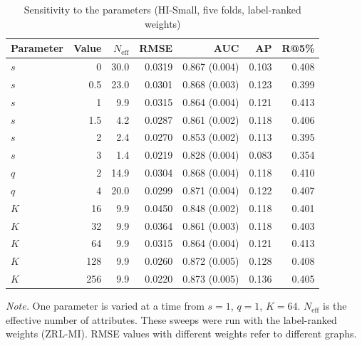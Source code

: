\begin{table}[t]
\caption{Sensitivity to the parameters (HI-Small, five folds, label-ranked weights)}
\label{tab:sens}
\centering
\footnotesize
\begin{tabular}{@{}lrrrrrr@{}}
\toprule
Parameter & Value & $N_{\mathrm{eff}}$ & RMSE & AUC & AP & R@5\% \\
\midrule
$s$ & 0 & 30.0 & 0.0319 & 0.867 (0.004) & 0.103 & 0.408 \\
$s$ & 0.5 & 23.0 & 0.0301 & 0.868 (0.003) & 0.123 & 0.399 \\
$s$ & 1 & 9.9 & 0.0315 & 0.864 (0.004) & 0.121 & 0.413 \\
$s$ & 1.5 & 4.2 & 0.0287 & 0.861 (0.002) & 0.118 & 0.406 \\
$s$ & 2 & 2.4 & 0.0270 & 0.853 (0.002) & 0.113 & 0.395 \\
$s$ & 3 & 1.4 & 0.0219 & 0.828 (0.004) & 0.083 & 0.354 \\
\addlinespace
$q$ & 2 & 14.9 & 0.0304 & 0.868 (0.004) & 0.118 & 0.410 \\
$q$ & 4 & 20.0 & 0.0299 & 0.871 (0.004) & 0.122 & 0.407 \\
\addlinespace
$K$ & 16 & 9.9 & 0.0450 & 0.848 (0.002) & 0.118 & 0.401 \\
$K$ & 32 & 9.9 & 0.0364 & 0.861 (0.003) & 0.118 & 0.403 \\
$K$ & 64 & 9.9 & 0.0315 & 0.864 (0.004) & 0.121 & 0.413 \\
$K$ & 128 & 9.9 & 0.0260 & 0.872 (0.005) & 0.128 & 0.408 \\
$K$ & 256 & 9.9 & 0.0220 & 0.873 (0.005) & 0.136 & 0.405 \\
\bottomrule
\end{tabular}
\par\vspace{3pt}\parbox{0.98\columnwidth}{\footnotesize \emph{Note.} One parameter is varied at a time from $s=1$, $q=1$, $K=64$. $N_{\mathrm{eff}}$ is the effective number of attributes. These sweeps were run with the label-ranked weights (ZRL-MI). RMSE values with different weights refer to different graphs.}
\end{table}

\begin{table}[t]
\caption{Attribute ablations (HI-Small, five folds, label-ranked weights)}
\label{tab:ablation}
\centering
\footnotesize
{}
\end{table}

